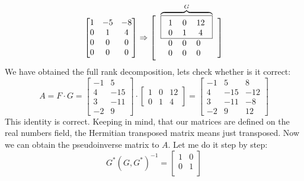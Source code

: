 \documentclass[12pt]{report}
\begin{document}
\begin{solution}
\[\begin{array}{c}
\begin{bmatrix}
            1 & -5 & -8\\
            0 & 1 & 4\\
            0 & 0 & 0\\
            0 & 0 & 0
         \end{bmatrix} \Rightarrow \VVast[\begin{tabular}{c} \\[-1cm]
            $\overbrace{\fbox{\begin{tabular}{ccc}
               $1$ & $0$ & $12$\\
               $0$ & $1$ & $4$ \\[-0.1cm]
            \end{tabular}}}^G$ \\
            \hspace*{-0.3cm} \begin{tabular}{ccc}
               $0$ & $0$ & $0$\\
               $0$ & $0$ & $0$
            \end{tabular}
            \end{tabular}\Vast]
      \end{array}
   \]
   We have obtained the full rank decomposition, lets check whether is it correct:
   \[
      A  = F \cdot G = \begin{bmatrix}
         -1 & 5 \\
         4 & -15 \\
         3 & -11 \\
         -2 & 9
      \end{bmatrix} \cdot \begin{bmatrix}
         1 & 0 & 12\\
         0 & 1 & 4
      \end{bmatrix} = \begin{bmatrix}
         -1 & 5 & 8\\
         4 & -15 & -12\\
         3 & -11 & -8\\
         -2 & 9 & 12
      \end{bmatrix}
   \]
   This identity is correct. Keeping in mind, that our matrices are defined on the real numbers field, the Hermitian transposed matrix means just transposed. Now we can obtain the pseudoinverse matrix to $A$. Let me do it step by step:
   \[
      G^*\left(G, G^*\right)^{-1} = \begin{bmatrix}
         1 & 0 \\
         0 & 1\\

\end{bmatrix}\]
\end{solution}
\end{document}
